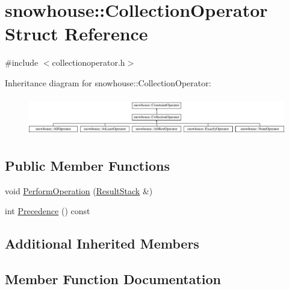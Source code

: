 \hypertarget{structsnowhouse_1_1CollectionOperator}{}\section{snowhouse\+::Collection\+Operator Struct Reference}
\label{structsnowhouse_1_1CollectionOperator}


{\ttfamily \#include $<$collectionoperator.\+h$>$}

Inheritance diagram for snowhouse\+::Collection\+Operator\+:\begin{figure}[H]
\begin{center}
\leavevmode
\includegraphics[height=1.705584cm]{structsnowhouse_1_1CollectionOperator}
\end{center}
\end{figure}
\subsection*{Public Member Functions}
\begin{DoxyCompactItemize}
\item 
void \mbox{\hyperlink{structsnowhouse_1_1CollectionOperator_a7a7d525c230d238e0d643c2135be5f1d}{Perform\+Operation}} (\mbox{\hyperlink{namespacesnowhouse_a719169b1315a13161c15f25e600a8f51}{Result\+Stack}} \&)
\item 
int \mbox{\hyperlink{structsnowhouse_1_1CollectionOperator_a07f46f3b8e9c56464624b55ba1b8189c}{Precedence}} () const
\end{DoxyCompactItemize}
\subsection*{Additional Inherited Members}


\subsection{Member Function Documentation}
\mbox{\label{structsnowhouse_1_1CollectionOperator_a7a7d525c230d238e0d643c2135be5f1d}} 
